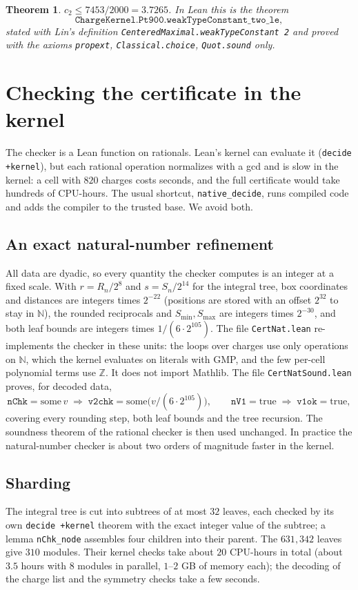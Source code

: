 \documentclass[11pt]{amsart}
\newtheorem{theorem}{Theorem}[section]
\theoremstyle{definition}
\theoremstyle{remark}
\newcommand{\N}{\mathbb{N}}
\newcommand{\Z}{\mathbb{Z}}
\newcommand{\lean}[1]{\texttt{#1}}
\begin{document}
\begin{theorem}\label{thm:main}
$c_2 \le 7453/2000 = 3.7265$. In Lean this is the theorem
\[ \texttt{ChargeKernel.Pt900.weakTypeConstant\_two\_le} , \]
stated with Lin's definition \lean{CenteredMaximal.weakTypeConstant 2} and proved with the axioms
\lean{propext}, \lean{Classical.choice}, \lean{Quot.sound} only.
\end{theorem}

\section{Checking the certificate in the kernel}\label{sec:nat}

The checker is a Lean function on rationals. Lean's kernel can evaluate it (\lean{decide +kernel}),
but each rational operation normalizes with a gcd and is slow in the kernel: a cell with $820$ charges
costs seconds, and the full certificate would take hundreds of CPU-hours. The usual shortcut,
\lean{native\_decide}, runs compiled code and adds the compiler to the trusted base. We avoid both.

\subsection*{An exact natural-number refinement}
All data are dyadic, so every quantity the checker computes is an integer at a fixed scale. With
$r = R_n/2^8$ and $s = S_n/2^{14}$ for the integral tree, box coordinates and distances are integers
times $2^{-22}$ (positions are stored with an offset $2^{32}$ to stay in $\N$), the rounded
reciprocals and $S_{\min}, S_{\max}$ are integers times $2^{-30}$, and both leaf bounds are integers
times $1/(6 \cdot 2^{105})$. The file \lean{CertNat.lean} re-implements the checker in these units: the
loops over charges use only operations on $\N$, which the kernel evaluates on literals with GMP,
and the few per-cell polynomial terms use $\Z$. It does not import Mathlib.
The file \lean{CertNatSound.lean} proves, for decoded data,
\[ \texttt{nChk} = \mathrm{some}\, v \;\Longrightarrow\; \texttt{v2chk} = \mathrm{some}\bigl(v/(6\cdot 2^{105})\bigr), \qquad
\texttt{nV1} = \mathrm{true} \;\Longrightarrow\; \texttt{v1ok} = \mathrm{true}, \]
covering every rounding step, both leaf bounds and the tree recursion. The soundness theorem of the
rational checker is then used unchanged. In practice the natural-number checker is about two orders
of magnitude faster in the kernel.

\subsection*{Sharding}
The integral tree is cut into subtrees of at most $32$ leaves, each checked by its own
\lean{decide +kernel} theorem with the exact integer value of the subtree; a lemma
\lean{nChk\_node} assembles four children into their parent. The $631{,}342$ leaves give $310$
modules. Their kernel checks take about $20$ CPU-hours in total (about $3.5$ hours with $8$ modules
in parallel, $1$--$2$ GB of memory each); the decoding of the charge list and the symmetry checks take
a few seconds.
\end{document}
